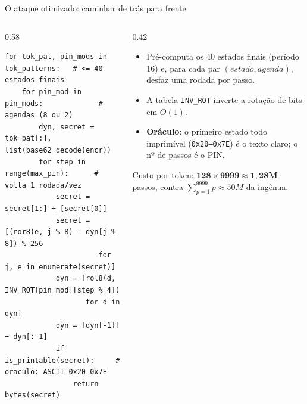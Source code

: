 \documentclass[aspectratio=169]{beamer}
\begin{document}
\begin{frame}[fragile]{O ataque otimizado: caminhar de trás para frente}
  \begin{columns}[T]
    \begin{column}{0.58\textwidth}
      \begin{lstlisting}[basicstyle=\ttfamily\scriptsize]
for tok_pat, pin_mods in tok_patterns:   # <= 40 estados finais
    for pin_mod in pin_mods:             # agendas (8 ou 2)
        dyn, secret = tok_pat[:], list(base62_decode(encr))
        for step in range(max_pin):      # volta 1 rodada/vez
            secret = secret[1:] + [secret[0]]
            secret = [(ror8(e, j % 8) - dyn[j % 8]) % 256
                      for j, e in enumerate(secret)]
            dyn = [rol8(d, INV_ROT[pin_mod][step % 4])
                   for d in dyn]
            dyn = [dyn[-1]] + dyn[:-1]
            if is_printable(secret):     # oraculo: ASCII 0x20-0x7E
                return bytes(secret)
      \end{lstlisting}
    \end{column}
    \begin{column}{0.42\textwidth}
      \begin{itemize}
        \item Pré-computa os 40 estados finais (período 16) e, para cada par
              $(estado, agenda)$, \alert{desfaz} uma rodada por passo.
        \item A tabela \texttt{INV\_ROT} inverte a rotação de bits em $O(1)$.
        \item \textbf{Oráculo}: o primeiro estado todo imprimível
              (\texttt{0x20--0x7E}) é o texto claro; o nº de passos é o PIN.
      \end{itemize}
      \begin{alertblock}{}
        Custo por token: $\mathbf{128 \times 9999 \approx 1{,}28M}$ passos,
        contra $\sum_{p=1}^{9999} p \approx 50M$ da ingênua.
      \end{alertblock}
    \end{column}
  \end{columns}
\end{frame}
\end{document}
